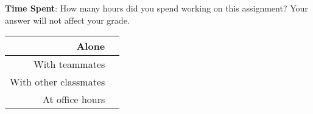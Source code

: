 \documentclass[12pt]{article}
\begin{document}
\noindent\textbf{Time Spent}: How many hours did you spend working on this assignment? Your answer will not affect your grade.

\begin{tcolorbox}[fit,height=10em, width=40em, blank, borderline={1pt}{1pt},nobeforeafter]
\begin{table}[H]
    \centering
    \begin{tabular}{r|c}
        Alone &  \hspace{3em} %
        \\ \hline
        With teammates & \hspace{3em} %
        \\ \hline
        With other classmates & \hspace{3em} %
        \\ \hline
        At office hours & \hspace{3em} %
        \\ \hline
    \end{tabular}
\end{table}
\end{tcolorbox}
\end{document}
